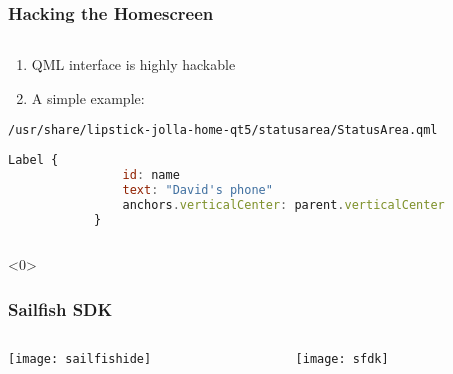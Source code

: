\documentclass[
	notes=none,
	aspectratio=169
]{beamer}
\begin{document}
\begin{frame}[fragile]
\frametitle{Hacking the Homescreen}

\begin{columns}[T]
\begin{column}[T]{1.0\textwidth}
\setlength{\parskip}{0.5em}

\vspace{0.4cm}
\begin{enumerate}
\setlength{\parskip}{0.5em}
\item QML interface is highly hackable
\item A simple example:
\end{enumerate}

{\tt /usr/share/lipstick-jolla-home-qt5/statusarea/StatusArea.qml}
\vspace{0.2cm}
\begin{lstlisting}[language=QML,firstnumber=141]
            Label {
                id: name
                text: "David's phone"
                anchors.verticalCenter: parent.verticalCenter
            }
\end{lstlisting}



\end{column}
\end{columns}

\end{frame}
\note{
}


\begin{frame}<0>
\frametitle{Sailfish SDK}

\begin{columns}[T]
\begin{column}[T]{0.5\textwidth}
\setlength{\parskip}{0.5em}

\vspace{0.3cm}
\hspace{0.1cm}
\texttt{[image: sailfishide]}

\end{column}
\begin{column}[T]{0.5\textwidth}
\setlength{\parskip}{0.5em}

\vspace{0.3cm}
\texttt{[image: sfdk]}

\end{column}
\end{columns}

\end{frame}
\note{
}
\end{document}
